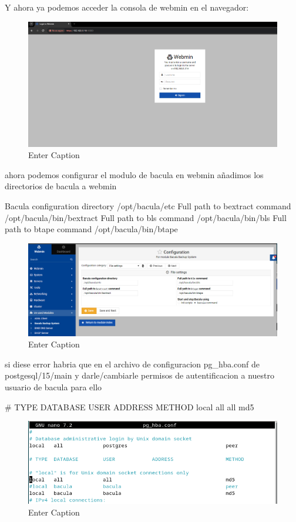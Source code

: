 Y ahora ya podemos acceder la consola de webmin en el navegador:

\begin{figure}[H]
    \centering
    \includegraphics[width=0.5\linewidth]{instalacionBacula/webmin.png}
    \caption{Enter Caption}
\end{figure}


ahora podemos configurar el modulo de bacula en webmin 
añadimos los directorios de bacula a webmin

Bacula configuration directory
/opt/bacula/etc
Full path to bextract command
/opt/bacula/bin/bextract
Full path to bls command
/opt/bacula/bin/bls
Full path to btape command
/opt/bacula/bin/btape

\begin{figure}[H]
    \centering
    \includegraphics[width=0.5\linewidth]{instalacionBacula/pathwebmin.png}
    \caption{Enter Caption}
\end{figure}


si diese error habria que en el archivo de configuracion pg\_hba.conf de postgesql/15/main y darle/cambiarle permisos de autentificacion a nuestro usuario de bacula para ello

\# TYPE  DATABASE        USER            ADDRESS                 METHOD
local   all             all                                     md5

\begin{figure}[H]
    \centering
    \includegraphics[width=0.5\linewidth]{instalacionBacula/md5postgesql.png}
    \caption{Enter Caption}
\end{figure}

